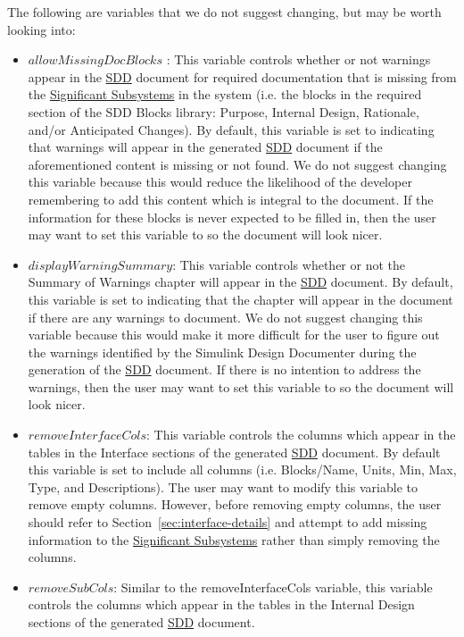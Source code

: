 \documentclass{mcscert}
\newcommand{\sddtool}{Simulink Design Documenter}
\newcommand{\sigsubsnolink}{Significant Subsystems} %
\newcommand{\sigsubs}{\hyperref[def:sigsubs]{\sigsubsnolink{}}}
\begin{document}
	The following are variables that we do not suggest changing, but may be worth looking into:
	\begin{itemize}
		\item $allowMissingDocBlocks$ \label{itm:allowMissingDocBlocks}: 
		This variable controls whether or not warnings appear in the \hyperref[acr:sdd]{SDD} document for required documentation that is missing from the \sigsubs{} in the system (i.e. the blocks in the required section of the SDD Blocks library: Purpose, Internal Design, Rationale, and/or Anticipated Changes). 
		By default, this variable is set to  indicating that warnings will appear in the generated \hyperref[acr:sdd]{SDD} document if the aforementioned content is missing or not found. 
		We do not suggest changing this variable because this would reduce the likelihood of the developer remembering to add this content which is integral to the document. 
		If the information for these blocks is never expected to be filled in, then the user may want to set this variable to  so the document will look nicer.
		\item $displayWarningSummary$: 
		This variable controls whether or not the Summary of Warnings chapter will appear in the \hyperref[acr:sdd]{SDD} document. 
		By default, this variable is set to  indicating that the chapter will appear in the document if there are any warnings to document. 
		We do not suggest changing this variable because this would make it more difficult for the user to figure out the warnings identified by the \sddtool{} during the generation of the \hyperref[acr:sdd]{SDD} document. If there is no intention to address the warnings, then the user may want to set this variable to  so the document will look nicer.
		\item $removeInterfaceCols$: 
		This variable controls the columns which appear in the tables in the Interface sections of the generated \hyperref[acr:sdd]{SDD} document. 
		By default this variable is set to include all columns (i.e. Blocks/Name, Units, Min, Max, Type, and Descriptions). 
		The user may want to modify this variable to remove empty columns. 
		However, before removing empty columns, the user should refer to Section~\ref{sec:interface-details} and attempt to add missing information to the \sigsubs{} rather than simply removing the columns.
		\item $removeSubCols$: 
		Similar to the removeInterfaceCols variable, this variable controls the columns which appear in the tables in the Internal Design sections of the generated \hyperref[acr:sdd]{SDD} document. 

\end{itemize}
\end{document}
